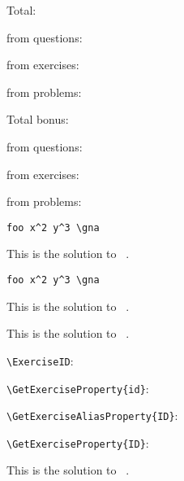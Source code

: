 \documentclass{article}
\newcommand*\writehere{%
      \IfInsideSolutionTF{}{%
        \tcblower
        \emph{Your answer:}
        \vspace*{4cm}
      }%
    }
\begin{document}
\gradingtable \par \bigskip

Total: \printtotalpoints \par
from questions:  \par
from exercises:  \par
from problems:  \par \bigskip

Total bonus: \printtotalbonus \par
from questions:  \par
from exercises:  \par
from problems:  \par

\begin{exercise}[points=4,bonus-points=1,topics=geometry,tags={geometry,triangles},grade=7]
  \lipsum[1]
\begin{verbatim}
foo x^2 y^3 \gna
\end{verbatim}
\end{exercise}
\begin{solution}[print]
  This is the solution to \ExerciseType\ .
\begin{verbatim}
foo x^2 y^3 \gna
\end{verbatim}
\end{solution}

\begin{exercise}[subtitle=Foo,points=5,topics=analysis,tags={analysis,functions},grade=11]
  \lipsum[2]
\end{exercise}
\begin{solution}
  This is the solution to \ExerciseType\ .
\end{solution}

\begin{problem}[tags={analysis,functions}]
  \lipsum[3]
  \writehere
\end{problem}
\begin{answer}
  This is the solution to \ExerciseType\ .
\end{answer}

\begin{question}
  \lipsum[4]
  
  \verb+\ExerciseID+: 
  
  \verb+\GetExerciseProperty{id}+: 
  
  \verb+\GetExerciseAliasProperty{ID}+: 
  
  \verb+\GetExerciseProperty{ID}+: 
\end{question}
\begin{hint}
  This is the solution to \ExerciseType\ .
\end{hint}
\end{document}
